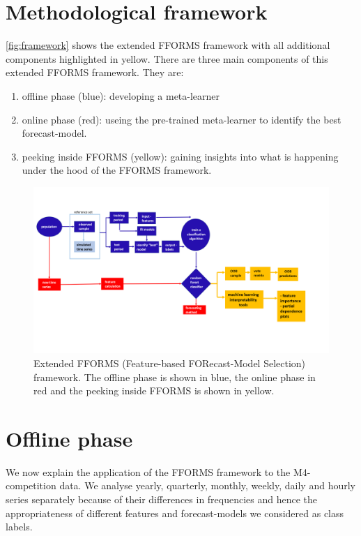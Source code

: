 \documentclass[11pt,a4paper,]{article}
\providecommand{\tightlist}{%
  \setlength{\itemsep}{0pt}\setlength{\parskip}{0pt}}
\begin{document}
\hypertarget{fforms}{%
\section{Methodological framework}\label{fforms}}

\autoref{fig:framework} shows the extended FFORMS framework with all additional components highlighted in yellow. There are three main components of this extended FFORMS framework. They are:

\begin{enumerate}
\def\labelenumi{\arabic{enumi}.}
\tightlist
\item
  offline phase (blue): developing a meta-learner
\item
  online phase (red): useing the pre-trained meta-learner to identify the best forecast-model.
\item
  peeking inside FFORMS (yellow): gaining insights into what is happening under the hood of the FFORMS framework.
\end{enumerate}

\begin{figure}[h]
\includegraphics[width=1.1\linewidth]{img/framework2} \caption{Extended FFORMS (Feature-based FORecast-Model Selection) framework. The offline phase is shown in blue, the online phase in red and the peeking inside FFORMS is shown in yellow.}\label{fig:framework}
\end{figure}

\hypertarget{offline}{%
\section{Offline phase}\label{offline}}

We now explain the application of the FFORMS framework to the M4-competition data. We analyse yearly, quarterly, monthly, weekly, daily and hourly series separately because of their differences in frequencies and hence the appropriateness of different features and forecast-models we considered as class labels.
\end{document}
